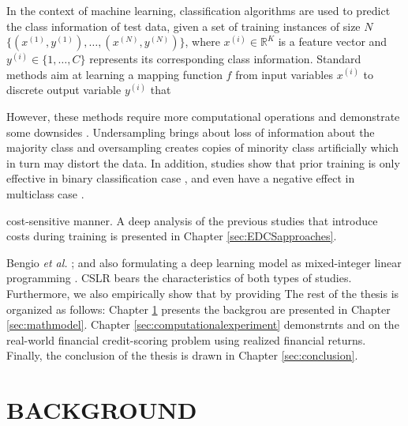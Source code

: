 \documentclass[a4paper,onesided,12pt]{report}
\begin{document}
In the context of machine learning, classification algorithms are used to predict the class information of test data, given a set of training instances of size $N$ $\{(x^{(1)},y^{(1)}), \dots, (x^{(N)},y^{(N)})\}$, where $x^{(i)} \in \mathbb{R}^{K}$ is a feature vector and $y^{(i)} \in \{1, \dots, C\}$ represents its corresponding class information. Standard methods aim at learning a mapping function $f$ from input variables $x^{(i)}$ to discrete output variable $y^{(i)}$ that

However, these methods require more computational operations and demonstrate some downsides \cite{khan2015cost}. Undersampling brings about loss of information about the majority class and oversampling creates copies of minority class artificially which in turn may distort the data. In addition, studies show that prior training is only effective in binary classification case \cite{1549828}, and even have a negative effect in multiclass case \cite{Zhou}. 

cost-sensitive manner. A deep analysis of the previous studies that introduce costs during training is presented in Chapter \ref{sec:EDCSapproaches}.

Bengio \emph{et al.} \cite{bengio2020machine}; and also formulating a deep learning model as mixed-integer linear programming \cite{fischetti2017deep, anderson2020strong}.  CSLR bears the characteristics of both types of studies. Furthermore, we also empirically show that by providing 
\newpage
The rest of the thesis is organized as follows: Chapter \ref{sec:background} presents the backgrou are presented in Chapter \ref{sec:mathmodel}. Chapter \ref{sec:computationalexperiment} demonstrnts and on the real-world financial credit-scoring problem using realized financial returns. Finally, the conclusion of the thesis is drawn in Chapter \ref{sec:conclusion}.

\chapter{BACKGROUND}
\label{sec:background}
\end{document}
